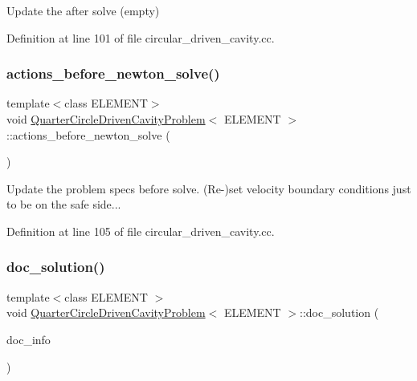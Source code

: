 Update the after solve (empty) 



Definition at line 101 of file circular\+\_\+driven\+\_\+cavity.\+cc.

\mbox{\label{classQuarterCircleDrivenCavityProblem_aa1d9cfd27fc1abe2a85e756009781547}} 
\subsubsection{\texorpdfstring{actions\+\_\+before\+\_\+newton\+\_\+solve()}{actions\_before\_newton\_solve()}}
{\footnotesize\ttfamily template$<$class E\+L\+E\+M\+E\+NT$>$ \\
void \hyperlink{classQuarterCircleDrivenCavityProblem}{Quarter\+Circle\+Driven\+Cavity\+Problem}$<$ E\+L\+E\+M\+E\+NT $>$\+::actions\+\_\+before\+\_\+newton\+\_\+solve (\begin{DoxyParamCaption}{ }\end{DoxyParamCaption})\hspace{0.3cm}{\ttfamily [inline]}}



Update the problem specs before solve. (Re-\/)set velocity boundary conditions just to be on the safe side... 



Definition at line 105 of file circular\+\_\+driven\+\_\+cavity.\+cc.

\mbox{\label{classQuarterCircleDrivenCavityProblem_a390b7b3c027a0253a2a3ac42f9715736}} 
\subsubsection{\texorpdfstring{doc\+\_\+solution()}{doc\_solution()}}
{\footnotesize\ttfamily template$<$class E\+L\+E\+M\+E\+NT $>$ \\
void \hyperlink{classQuarterCircleDrivenCavityProblem}{Quarter\+Circle\+Driven\+Cavity\+Problem}$<$ E\+L\+E\+M\+E\+NT $>$\+::doc\+\_\+solution (\begin{DoxyParamCaption}\item[{Doc\+Info \&}]{doc\+\_\+info }\end{DoxyParamCaption})}



